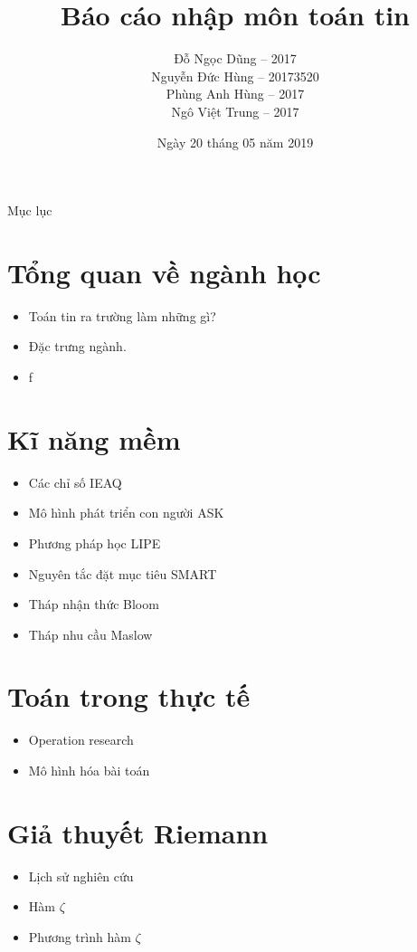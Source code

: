 \documentclass[aspectratio=43]{beamer}
\title{Báo cáo nhập môn toán tin}
\date{Ngày 20 tháng 05 năm 2019}
\author{
	Đỗ Ngọc Dũng -- 2017\\
	Nguyễn Đức Hùng -- 20173520\\
	Phùng Anh Hùng -- 2017\\
	Ngô Việt Trung -- 2017
}
\begin{document}
\begin{frame}
	\maketitle
\end{frame}

\begin{frame}{Mục lục}
\tableofcontents	
\end{frame}

\section{Tổng quan về ngành học}
\begin{frame}{\secname}	
	\begin{itemize}
		\item Toán tin ra trường làm những gì?
		\item Đặc trưng ngành.
		\item f
	\end{itemize}
\end{frame}

\section{Kĩ năng mềm}
\begin{frame}{\secname}
	\begin{itemize}
		\item Các chỉ số IEAQ
		\item Mô hình phát triển con người ASK
		\item Phương pháp học LIPE
		\item Nguyên tắc đặt mục tiêu SMART
		\item Tháp nhận thức Bloom
		\item Tháp nhu cầu Maslow
	\end{itemize}	
\end{frame}

\section{Toán trong thực tế}
\begin{frame}{\secname}
	\begin{itemize}
		\item Operation research
		\item Mô hình hóa bài toán
	\end{itemize}	
\end{frame}

\begin{frame}{\secname}
	
\end{frame}

\section{Giả thuyết Riemann}
\begin{frame}{\secname}
	\begin{itemize}
		\item Lịch sử nghiên cứu
		\item Hàm $\zeta$
		\item Phương trình hàm $\zeta$
	\end{itemize}	
\end{frame}
\end{document}
